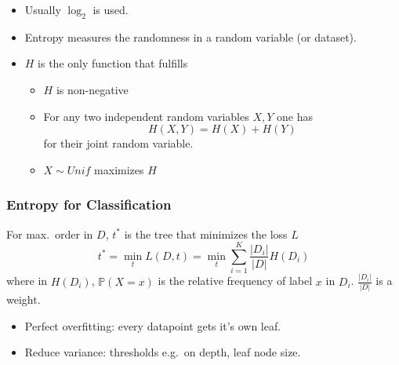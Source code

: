 
\begin{itemize}
    \item Usually $\log_2$ is used.
    \item Entropy measures the randomness in a random variable (or dataset).
    \item $H$ is the only function that fulfills
          \begin{itemize}
              \item $H$ is non-negative
              \item For any two independent random variables $X,Y$ one has
                    \begin{equation*}
                        H(X,Y)=H(X)+H(Y)
                    \end{equation*} for their joint random variable.
              \item $X\sim Unif$ maximizes $H$
          \end{itemize}
\end{itemize}

\subsubsection{Entropy for Classification}
For max.\ order in $D$, $t^*$ is the tree that minimizes the loss $L$
\noindent\begin{equation*}
    t^* = \min_t L(D,t) =\min_t \sum_{i=1}^{K} \frac{|D_i|}{|D|}H(D_i)
\end{equation*}
where in $H(D_i)$, $\mathbb{P}(X=x)$ is the relative frequency of label $x$ in $D_i$. $\frac{|D_i|}{|D|}$ is a weight.

\newpar{}
\begin{itemize}
    \item Perfect overfitting: every datapoint gets it's own leaf.
    \item Reduce variance: thresholds e.g.\ on depth, leaf node size.
\end{itemize}

